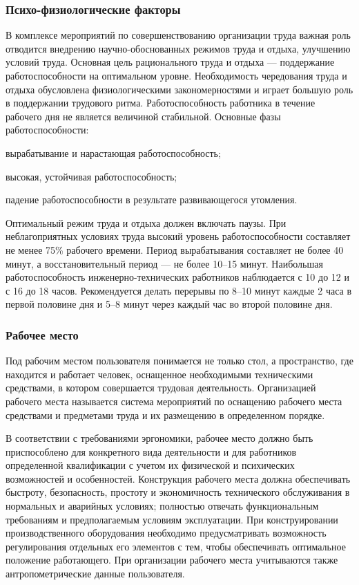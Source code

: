 \subsubsection{Психо-физиологические факторы}
\label{sec:bgd:trud:psych}
В комплексе мероприятий по совершенствованию организации труда важная роль отводится внедрению научно-обоснованных режимов труда и отдыха, улучшению условий труда.
Основная цель рационального труда и отдыха --- поддержание работоспособности на оптимальном уровне. Необходимость чередования труда и отдыха обусловлена физиологическими закономерностями и играет большую роль в поддержании трудового ритма.
Работоспособность работника в течение рабочего дня не является величиной стабильной. Основные фазы работоспособности:
\begin{compactitem}
\item вырабатывание и нарастающая работоспособность;
\item высокая, устойчивая работоспособность;
\item падение работоспособности в результате развивающегося утомления.
\end{compactitem}
Оптимальный режим труда и отдыха должен включать паузы. При неблагоприятных условиях труда высокий уровень работоспособности составляет не менее 75\% рабочего времени. Период вырабатывания составляет не более 40 минут, а восстановительный период --- не более 10--15 минут.
Наибольшая работоспособность инженерно-технических работников наблюдается с 10 до 12 и с 16 до 18 часов. Рекомендуется делать перерывы по 8--10 минут каждые 2 часа в первой половине дня и 5--8 минут через каждый час во второй половине дня.

\subsubsection{Рабочее место}
\label{sec:bgd:trud:workplace}
Под рабочим местом пользователя понимается не только стол, а пространство, где находится и работает человек, оснащенное необходимыми техническими средствами, в котором совершается трудовая деятельность. Организацией рабочего места называется система мероприятий по оснащению рабочего места средствами и предметами труда и их размещению в определенном порядке.

В соответствии с требованиями эргономики, рабочее место должно быть приспособлено для конкретного вида деятельности и для работников определенной квалификации с учетом их физической и психических возможностей и особенностей. Конструкция рабочего места должна обеспечивать быстроту, безопасность, простоту и экономичность технического обслуживания в нормальных и аварийных условиях; полностью отвечать функциональным требованиям и предполагаемым условиям эксплуатации. При конструировании производственного оборудования необходимо предусматривать возможность регулирования отдельных его элементов с тем, чтобы обеспечивать оптимальное положение работающего. При организации рабочего места учитываются также антропометрические данные пользователя.

